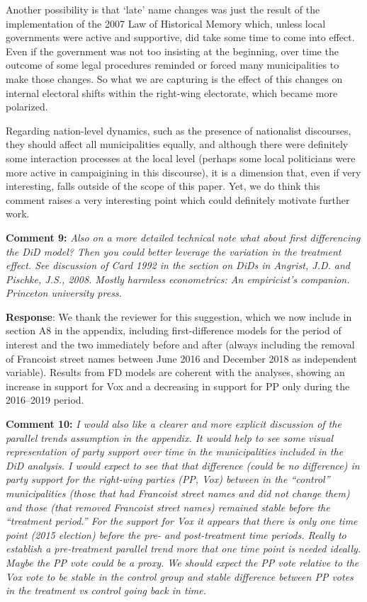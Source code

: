 \documentclass[12pt, a4paper, notitlepage]{article}
\begin{document}
Another possibility is that `late' name changes was just the result of the implementation of the 2007 Law of Historical Memory which, unless local governments were active and supportive, did take some time to come into effect.
Even if the government was not too insisting at the beginning, over time the outcome of some legal procedures reminded or forced many municipalities to make those changes.
So what we are capturing is the effect of this changes on internal electoral shifts within the right-wing electorate, which became more polarized.

Regarding nation-level dynamics, such as the presence of nationalist discourses, they should affect all municipalities equally, and although there were definitely some interaction processes at the local level (perhaps some local politicians were more active in campaigining in this discourse), it is a dimension that, even if very interesting, falls outside of the scope of this paper.
Yet, we do think this comment raises a very interesting point which could definitely motivate further work.

{}

\textbf{Comment 9:} \textit{Also on a more detailed technical note what about first differencing the DiD model? Then you could better leverage the variation in the treatment effect. See discussion of Card 1992 in the section on DiDs in Angrist, J.D. and Pischke, J.S., 2008. Mostly harmless econometrics: An empiricist's companion. Princeton university press.}

\textbf{Response}: We thank the reviewer for this suggestion, which we now include in section A8 in the appendix, including first-difference models for the period of interest and the two immediately before and after (always including the removal of Francoist street names between June 2016 and December 2018 as independent variable). Results from FD models are coherent with the analyses, showing an increase in support for Vox and a decreasing in support for PP only during the 2016--2019 period.

\textbf{Comment 10:} \textit{I would also like a clearer and more explicit discussion of the parallel trends assumption in the appendix. It would help to see some visual representation of party support over time in the municipalities included in the DiD analysis. I would expect to see that that difference (could be no difference) in party support for the right-wing parties (PP, Vox) between in the “control” municipalities (those that had Francoist street names and did not change them) and those (that removed Francoist street names) remained stable before the “treatment period.”
For the support for Vox it appears that there is only one time point (2015 election) before the pre- and post-treatment time periods. Really to establish a pre-treatment parallel trend more that one time point is needed ideally. Maybe the PP vote could be a proxy. We should expect the PP vote relative to the Vox vote to be stable in the control group and stable difference between PP votes in the treatment vs control going back in time.}
\end{document}
